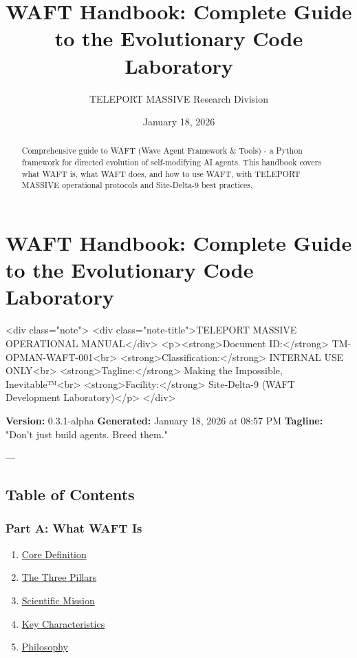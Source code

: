 \documentclass{article}
\title{WAFT Handbook: Complete Guide to the Evolutionary Code Laboratory}
\author{TELEPORT MASSIVE Research Division}
\date{January 18, 2026}
\begin{document}
\maketitle

\begin{abstract}
Comprehensive guide to WAFT (Wave Agent Framework & Tools) - a Python framework for directed evolution of self-modifying AI agents. This handbook covers what WAFT is, what WAFT does, and how to use WAFT, with TELEPORT MASSIVE operational protocols and Site-Delta-9 best practices.
\end{abstract}


\section{WAFT Handbook: Complete Guide to the Evolutionary Code Laboratory}

<div class="note">
    <div class="note-title">TELEPORT MASSIVE OPERATIONAL MANUAL</div>
    <p><strong>Document ID:</strong> TM-OPMAN-WAFT-001<br>
    <strong>Classification:</strong> INTERNAL USE ONLY<br>
    <strong>Tagline:</strong> Making the Impossible, Inevitable™<br>
    <strong>Facility:</strong> Site-Delta-9 (WAFT Development Laboratory)</p>
</div>

\textbf{Version:} 0.3.1-alpha  
\textbf{Generated:} January 18, 2026 at 08:57 PM  
\textbf{Tagline:} "Don't just build agents. Breed them."

---

\subsection{Table of Contents}

\subsubsection{Part A: What WAFT Is}
\begin{enumerate}
\item \href{#core-definition}{Core Definition}
\item \href{#the-three-pillars}{The Three Pillars}
\item \href{#scientific-mission}{Scientific Mission}
\item \href{#key-characteristics}{Key Characteristics}
\item \href{#philosophy}{Philosophy}
\end{enumerate}
\end{document}

